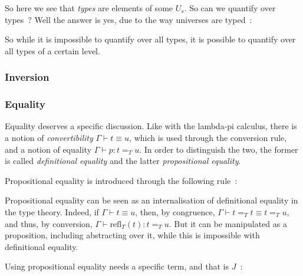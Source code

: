 So here we see that \emph{types} are elements of some $U_{s}$. So can we
quantify over types~? Well the answer is yes, due to the way universes are
typed~:

\begin{center}\begin{prooftree}
\end{prooftree}\end{center}

So while it is impossible to quantify over all types, it is possible to quantify
over all types of a certain level.

\subsubsection{Inversion}\label{mltt-inv}


\subsubsection{Equality}\label{mltt-eq}

Equality deserves a specific discussion. Like with the lambda-pi calculus, there
is a notion of \emph{convertibility} $\Gamma\vdash t \equiv u$, which is used through the
conversion rule, and a notion of equality $\Gamma\vdash p : t =_{T} u$. In order to
distinguish the two, the former is called \emph{definitional equality} and the
latter \emph{propositional equality}.

Propositional equality is introduced through the following rule~:

\begin{center}\begin{prooftree}
\end{prooftree}\end{center}

Propositional equality can be seen as an internalisation of definitional
equality in the type theory. Indeed, if $\Gamma\vdash t \equiv u$, then, by congruence,
$\Gamma\vdash t =_{T} t \equiv t =_{T} u$, and thus, by conversion,
$\Gamma\vdash\text{refl}_{T}(t) : t =_{T} u$. But it can be manipulated as a proposition,
including abstracting over it, while this is impossible with definitional
equality.

Using propositional equality needs a specific term, and that is $J$~:

\begin{center}\begin{prooftree}
\end{prooftree}\end{center}

